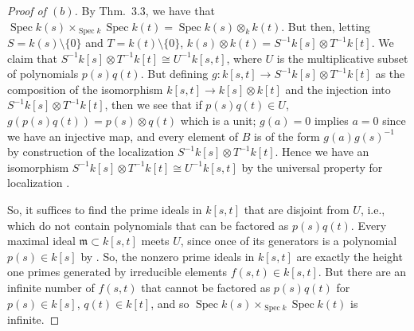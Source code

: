 \documentclass[12pt,letterpaper]{article}
\theoremstyle{definition}
\theoremstyle{remark}
\numberwithin{equation}{section}
\numberwithin{figure}{problem}
\DeclareMathOperator{\Spec}{Spec}
\begin{document}
\begin{proof}[Proof of $(b)$]
  By Thm.~3.3, we have that $\Spec k(s) \times_{\Spec k} \Spec k(t) = \Spec k(s) \otimes_k k(t)$. But then, letting $S = k(s) \setminus \{0\}$ and $T = k(t) \setminus \{0\}$, $k(s) \otimes k(t) = S^{-1}k[s] \otimes T^{-1}k[t]$. We claim that $S^{-1}k[s] \otimes T^{-1}k[t] \cong U^{-1}k[s,t]$, where $U$ is the multiplicative subset of polynomials $p(s)q(t)$. But defining $g \colon k[s,t] \to S^{-1}k[s] \otimes T^{-1}k[t]$ as the composition of the isomorphism $k[s,t] \to k[s] \otimes k[t]$ and the injection into $S^{-1}k[s] \otimes T^{-1}k[t]$, then we see that if $p(s)q(t) \in U$, $g(p(s)q(t)) = p(s) \otimes q(t)$ which is a unit; $g(a) = 0$ implies $a = 0$ since we have an injective map, and every element of $B$ is of the form $g(a)g(s)^{-1}$ by construction of the localization $S^{-1}k[s] \otimes T^{-1}k[t]$. Hence we have an isomorphism $S^{-1}k[s] \otimes T^{-1}k[t] \cong U^{-1}k[s,t]$ by the universal property for localization \cite[Cor.~3.2]{AM69}.
  \par So, it suffices to find the prime ideals in $k[s,t]$ that are disjoint from $U$, i.e., which do not contain polynomials that can be factored as $p(s)q(t)$. Every maximal ideal $\mathfrak{m} \subset k[s,t]$ meets $U$, since once of its generators is a polynomial $p(s) \in k[s]$ by \cite[Prop.~1.5]{Rei95}. So, the nonzero prime ideals in $k[s,t]$ are exactly the height one primes generated by irreducible elements $f(s,t) \in k[s,t]$. But there are an infinite number of $f(s,t)$ that cannot be factored as $p(s)q(t)$ for $p(s) \in k[s]$, $q(t) \in k[t]$, and so $\Spec k(s) \times_{\Spec k} \Spec k(t)$ is infinite.
\end{proof}
\end{document}
